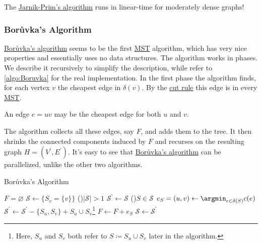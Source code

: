 \begin{remark}
	The \hyperref[algo:Jarnik-Prim]{Jarnik-Prim's algorithm} runs in linear-time for moderately dense graphs!
\end{remark}

\subsubsection{Borůvka's Algorithm}
\hyperref[algo:Boruvka]{Borůvka's algorithm} seems to be the first \hyperref[prb:MST]{MST} algorithm, which has very nice properties and essentially uses no data structures. The algorithm works in phases. We describe it recursively to simplify the description, while refer to \autoref{algo:Boruvka} for the real implementation. In the first phase the algorithm finds, for each vertex \(v\) the cheapest edge in \(\delta (v)\). By the \hyperref[lma:cut-rule]{cut rule} this edge is in every \hyperref[prb:MST]{MST}.

\begin{note}
	An edge \(e = uv\) may be the cheapest edge for both \(u\) and \(v\).
\end{note}

The algorithm collects all these edges, say \(F\), and adds them to the tree. It then shrinks the connected components induced by \(F\) and recurses on the resulting graph \(H = (V^{\prime}  , E^{\prime} )\). It's easy to see that \hyperref[algo:Boruvka]{Borůvka's algorithm} can be parallelized, unlike the other two algorithms.

\begin{algorithm}[H]\label{algo:Boruvka}
	\DontPrintSemicolon{}
	\caption{Borůvka's Algorithm}
	\BlankLine

	\(F = \varnothing \)
	\(\mathcal{S} \gets \{ S_v = \{ v \} \} \)
	\While(){\(\lvert \mathcal{S} \rvert > 1\)}{
		\(\mathcal{S} ^{\prime} \gets \mathcal{S} \)
		\For(){\(S \in \mathcal{S} \)}{
			\(e_S = (u, v) \gets \argmin_{e \in \delta (S)} c(e)\)\;
			\(\mathcal{S}^{\prime} \gets \mathcal{S}^{\prime} - \{ S_u, S_v \} + S_u \cup S_v\)\footnote{Here, \(S_u\) and \(S_v\) both refer to \(S \coloneqq S_u \cup S_v\) later in the algorithm.}
			\(F \gets F + e_S\)
		}
		\(\mathcal{S} \gets \mathcal{S} ^{\prime} \)
	}
	\;
\end{algorithm}

